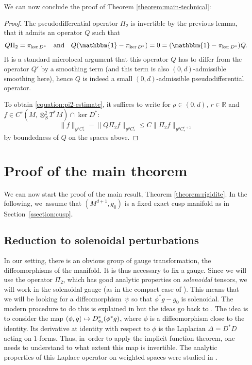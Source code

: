 \documentclass[10pt]{amsart}
\newcommand\mto{\mathchoice{\longmapsto}{\mapsto}{\mapsto}{\mapsto}}
\newcommand{\quand}{\quad\text{and}\quad}
\newcommand{\R}{\mathbb{R}}
\theoremstyle{plain}
\theoremstyle{definition}
\begin{document}
We can now conclude the proof of Theorem \ref{theorem:main-technical}:

\begin{proof}
The pseudodifferential operator $\Pi_2$ is invertible by the previous lemma, that it admits an operator $Q$ such that
\[
Q\Pi_2 = \pi_{\ker D^*}\quand Q(\mathbbm{1}-\pi_{\ker D^*})=0 =(\mathbbm{1}-\pi_{\ker D^*})Q. 
\]
It is a standard microlocal argument that this operator $Q$ has to differ from the operator $Q'$ by a smoothing term (and this term is also $(0,d)$-admissible smoothing here), hence $Q$ is indeed a small $(0,d)$-admissible pseudodifferential operator.

To obtain \eqref{equation:pi2-estimate}, it suffices to write for $\rho \in (0,d)$, $r \in \R$ and $f \in C^r(M,\otimes^2_S T^*M) \cap \ker D^*$:
\[
\|f\|_{y^\rho C^r_*} = \|Q\Pi_2f\|_{y^\rho C^r_*} \leq C\|\Pi_2 f\|_{y^\rho C^{r+1}_*}
\]
by boundedness of $Q$ on the spaces above.
\end{proof}

\section{Proof of the main theorem}

We can now start the proof of the main result, Theorem \ref{theorem:rigidite}. In the following, we~assume that $(M^{d+1},g_0)$ is a fixed exact cusp manifold as in Section~\ref{ssection:cusp}.

\label{section:end}

\subsection{Reduction to solenoidal perturbations}

\label{ssection:reduction}

In our setting, there is an obvious group of gauge transformation, the diffeomorphisms of the manifold. It is thus necessary to fix a gauge. Since we will use the operator $\Pi_2$, which has good analytic properties on \emph{solenoidal} tensors, we will work in the solenoidal gauge (as in the compact case of \cite{Guillarmou-Lefeuvre-18}). This means that we will be looking for a diffeomorphism~$\psi$ so that $\phi^\ast g - g_0$ is solenoidal. The modern procedure to do this is explained in \cite[Lem.\,4.1]{Guillarmou-Lefeuvre-18} but the ideas go back to \cite{Ebin-68}. The idea is to consider the map $(\phi,g) \mto D^\ast_{g_0}(\phi^\ast g)$, where $\phi$ is a diffeomorphism close to the identity. Its derivative at {\color{black}identity} with respect to $\phi$ is the Laplacian $\Delta = D^\ast D$ acting on $1$-forms. Thus, in~order to apply the implicit function theorem, one needs to understand to what extent this map is invertible. The analytic properties of this Laplace operator on weighted spaces were studied in \cite[Lem.\,5.4]{Bonthonneau-Lefeuvre-19-1}.
\end{document}

